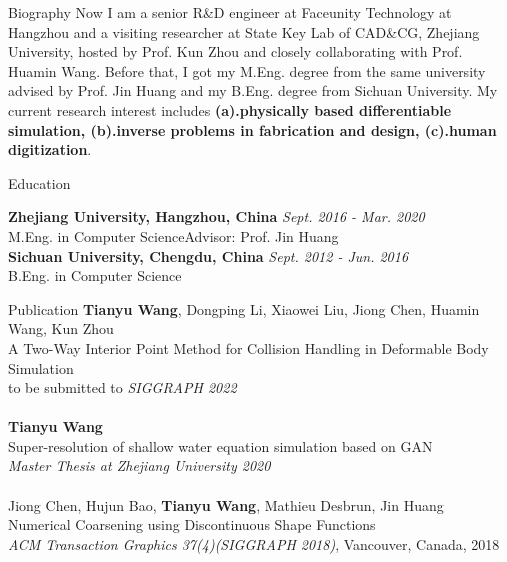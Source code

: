 \documentclass{resume} %
\begin{document}
\begin{rSection}{Biography}
  Now I am a senior R\&D engineer at Faceunity Technology at Hangzhou and a visiting researcher at State Key Lab of CAD\&CG, Zhejiang University, hosted by Prof. Kun Zhou and closely collaborating with Prof. Huamin Wang. Before that, I got my M.Eng. degree from the same university advised by Prof. Jin Huang and my B.Eng. degree from Sichuan University. My current research interest includes \textbf{(a).physically based differentiable simulation, (b).inverse problems in fabrication and design, (c).human digitization}.
\end{rSection}

\begin{rSection}{Education}

{\bf Zhejiang University, Hangzhou, China} \hfill {\em Sept. 2016 - Mar. 2020} 
\\ M.Eng. in Computer Science\hfill {Advisor: Prof. Jin Huang} 
\\{\bf Sichuan University, Chengdu, China} \hfill {\em Sept. 2012 - Jun. 2016} 
\\ B.Eng. in Computer Science\hfill {}

\end{rSection}

\begin{rSection}{Publication}
  {\textbf{Tianyu Wang}, Dongping Li, Xiaowei Liu, Jiong Chen, Huamin Wang, Kun Zhou\\ A Two-Way Interior Point Method for Collision Handling in Deformable Body Simulation\\ to be submitted to \emph{SIGGRAPH 2022}}
  \\ \\{\textbf{Tianyu Wang}\\Super-resolution of shallow water equation simulation based on GAN\\\emph{Master Thesis at Zhejiang University 2020}}
  \\ \\{Jiong Chen, Hujun Bao, \textbf{Tianyu Wang}, Mathieu Desbrun, Jin Huang\\Numerical Coarsening using Discontinuous Shape Functions\\\emph{ACM Transaction Graphics 37(4)(SIGGRAPH 2018)}, Vancouver, Canada, 2018}
\end{rSection}
\end{document}
